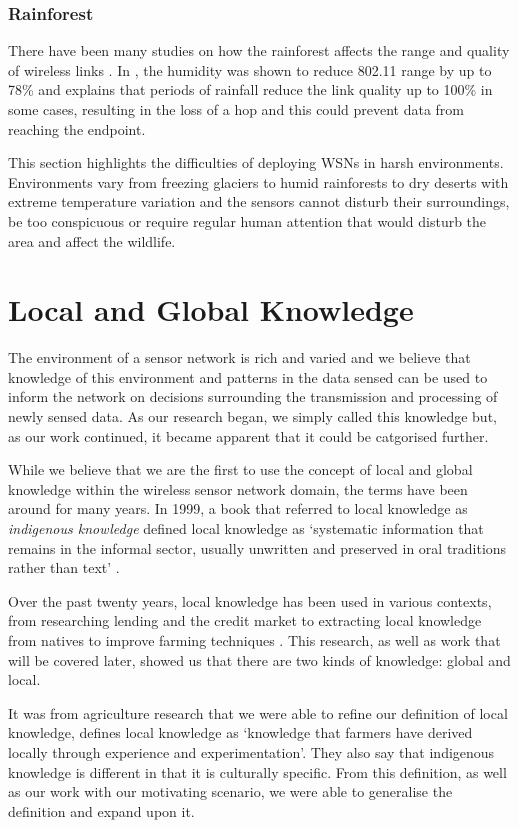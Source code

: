 	\subsubsection{Rainforest}
	There have been many studies on how the rainforest affects the range and quality of wireless links \cite{Figueiredo2009, Wark2008, Rahman2008}. In \cite{Figueiredo2009}, the humidity was shown to reduce 802.11 range by up to 78\% and \cite{Wark2008} explains that periods of rainfall reduce the link quality up to 100\% in some cases, resulting in the loss of a hop and this could prevent data from reaching the endpoint.


This section highlights the difficulties of deploying WSNs in harsh environments. Environments vary from freezing glaciers to humid rainforests to dry deserts with extreme temperature variation and the sensors cannot disturb their surroundings, be too conspicuous or require regular human attention that would disturb the area and affect the wildlife. 

\section{Local and Global Knowledge} \label{bg:lgk}
	The environment of a sensor network is rich and varied and we believe that knowledge of this environment and patterns in the data sensed can be used to inform the network on decisions surrounding the transmission and processing of newly sensed data. As our research began, we simply called this knowledge but, as our work continued, it became apparent that it could be catgorised further.

While we believe that we are the first to use the concept of local and global knowledge within the wireless sensor network domain, the terms have been around for many years. In 1999, a book that referred to local knowledge as \textit{indigenous knowledge} defined local knowledge as ‘systematic information that remains in the informal sector, usually unwritten and preserved in oral traditions rather than text’ \cite{LadislausM.Semali}. 

Over the past twenty years, local knowledge has been used in various contexts, from researching lending and the credit market \cite{Stiglitz1990} to extracting local knowledge from natives to improve farming techniques \cite{DEWALT}. This research, as well as work that will be covered later, showed us that there are two kinds of knowledge: global and local. 

It was from agriculture research that we were able to refine our definition of local knowledge, \cite{Joshi2001} defines local knowledge as ‘knowledge that farmers have derived locally through experience and experimentation’. They also say that indigenous knowledge is different in that it is culturally specific. From this definition, as well as our work with our motivating scenario, we were able to generalise the definition and expand upon it.

